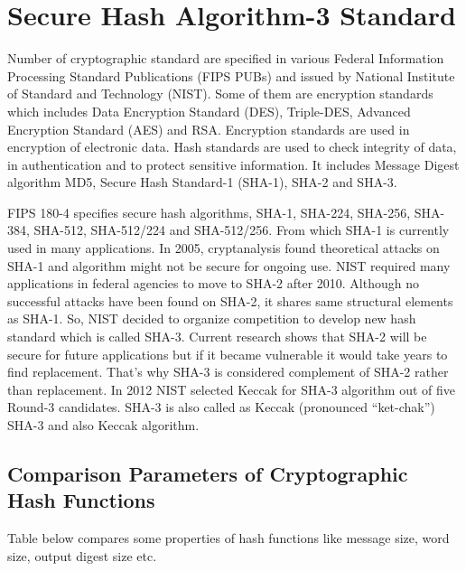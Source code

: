 \chapter{Secure Hash Algorithm-3 Standard}

Number of cryptographic standard are specified in various Federal Information Processing Standard Publications (FIPS PUBs) and issued by National Institute of Standard and Technology (NIST). Some of them are encryption standards which includes Data Encryption Standard (DES), Triple-DES, Advanced Encryption Standard (AES) and RSA. Encryption standards are used in encryption of electronic data. Hash standards are used to check integrity of data, in authentication and to protect sensitive information. It includes Message Digest algorithm MD5, Secure Hash Standard-1 (SHA-1), SHA-2 and SHA-3. \par

FIPS 180-4 specifies secure hash algorithms, SHA-1, SHA-224, SHA-256, SHA-384, SHA-512, SHA-512/224 and SHA-512/256. From which SHA-1 is currently used in many applications. In 2005, cryptanalysis found theoretical attacks on SHA-1 and algorithm might not be secure for ongoing use. NIST required many applications in federal agencies to move to SHA-2 after 2010. Although no successful attacks have been found on SHA-2, it shares same structural elements as SHA-1. So, NIST decided to organize competition to develop new hash standard which is called SHA-3. Current research shows that SHA-2 will be secure for future applications but if it became vulnerable it would take years to find replacement. That’s why SHA-3 is considered complement of SHA-2 rather than replacement\cite{insha3}. In 2012 NIST selected Keccak for SHA-3 algorithm out of five Round-3 candidates. SHA-3 is also called as Keccak (pronounced “ket-chak”) SHA-3 and also Keccak algorithm.

\section{Comparison Parameters of Cryptographic Hash Functions}

Table below compares some properties of hash functions \cite{shs} like message size, word size, output digest size etc.

